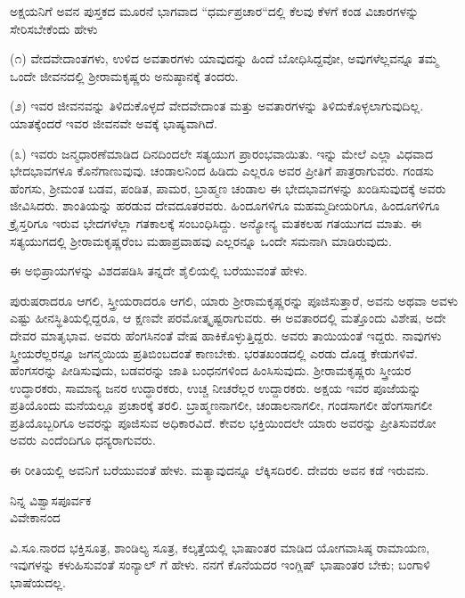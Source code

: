 ಅಕ್ಷಯನಿಗೆ ಅವನ ಪುಸ್ತಕದ ಮೂರನೆ ಭಾಗವಾದ “ಧರ್ಮಪ್ರಚಾರ“ದಲ್ಲಿ ಕೆಲವು ಕೆಳಗೆ ಕಂಡ ವಿಚಾರಗಳನ್ನು ಸೇರಿಸಬೇಕೆಂದು ಹೇಳು\enginline{-}
\vspace{0.3cm}

(೧) ವೇದವೇದಾಂತಗಳು, ಉಳಿದ ಅವತಾರಗಳು ಯಾವುದನ್ನು ಹಿಂದೆ ಬೋಧಿಸಿ\break ದ್ದವೋ, ಅವುಗಳೆಲ್ಲವನ್ನೂ ತಮ್ಮ ಒಂದೇ ಜೀವನದಲ್ಲಿ ಶ‍್ರೀರಾಮಕೃಷ್ಣರು ಅನುಷ್ಠಾನಕ್ಕೆ ತಂದರು.
\vspace{0.2cm}

(೨) ಇವರ ಜೀವನವನ್ನು ತಿಳಿದುಕೊಳ್ಳದೆ ವೇದವೇದಾಂತ ಮತ್ತು ಅವತಾರಗಳನ್ನು ತಿಳಿದುಕೊಳ್ಳಲಾಗುವುದಿಲ್ಲ. ಯಾತಕ್ಕೆಂದರೆ ಇವರ ಜೀವನವೇ ಅವಕ್ಕೆ ಭಾಷ್ಯವಾಗಿದೆ.
\vspace{0.3cm}

(೩) ಇವರು ಜನ್ಮಧಾರಣೆಮಾಡಿದ ದಿನದಿಂದಲೇ ಸತ್ಯಯುಗ ಪ್ರಾರಂಭವಾಯಿತು. ಇನ್ನು ಮೇಲೆ ಎಲ್ಲಾ ವಿಧವಾದ ಭೇದಭಾವಗಳೂ ಕೊನೆಗಾಣುವುವು. ಚಂಡಾಲನಿಂದ ಹಿಡಿದು ಎಲ್ಲರೂ ಅವರ ಪ್ರೀತಿಗೆ ಪಾತ್ರರಾಗುವರು. ಗಂಡಸು ಹೆಂಗಸು, ಶ‍್ರೀಮಂತ ಬಡವ, ಪಂಡಿತ, ಪಾಮರ, ಬ್ರಾಹ್ಮಣ ಚಂಡಾಲ ಈ ಭೇದಭಾವಗಳನ್ನು ಖಂಡಿಸುವುದಕ್ಕೆ ಅವರು ಜೀವಿಸಿದರು. ಶಾಂತಿಯನ್ನು ಹರಡುವ ದೇವದೂತರವರು. ಹಿಂದೂಗಳಿಗೂ ಮಹಮ್ಮದೀಯರಿಗೂ, ಹಿಂದೂಗಳಿಗೂ ಕ್ರೈಸ್ತರಿಗೂ ಇರುವ ಭೇದಗಳೆಲ್ಲಾ ಗತಕಾಲಕ್ಕೆ ಸಂಬಂಧಿಸಿದ್ದು. ಅನ್ಯೋನ್ಯ ಮತಕಲಹ ಗತಯುಗದ ಮಾತು. ಈ ಸತ್ಯಯುಗದಲ್ಲಿ ಶ‍್ರೀರಾಮಕೃಷ್ಣರೆಂಬ ಮಹಾಪ್ರವಾಹವು ಎಲ್ಲರನ್ನೂ ಒಂದೇ ಸಮನಾಗಿ ಮಾಡಿರುವುದು.
\vspace{0.2cm}

ಈ ಅಭಿಪ್ರಾಯಗಳನ್ನು ವಿಶದಪಡಿಸಿ ತನ್ನದೇ ಶೈಲಿಯಲ್ಲಿ ಬರೆಯುವಂತೆ ಹೇಳು.

ಪುರುಷರಾದರೂ ಆಗಲಿ, ಸ್ತ್ರೀಯರಾದರೂ ಆಗಲಿ, ಯಾರು ಶ‍್ರೀರಾಮಕೃಷ್ಣರನ್ನು ಪೂಜಿಸುತ್ತಾರೆ, ಅವನು ಅಥವಾ ಅವಳು ಎಷ್ಟು ಹೀನಸ್ಥಿತಿಯಲ್ಲಿದ್ದರೂ, ಆ ಕ್ಷಣವೇ ಪರಮೋತ್ಕೃಷ್ಟರಾಗುವರು. ಈ ಅವತಾರದಲ್ಲಿ ಮತ್ತೊಂದು ವಿಶೇಷ, ಅದೇ ದೇವರ ಮಾತೃಭಾವ. ಅವರು ಹೆಂಗಸಿನಂತೆ ವೇಷ ಹಾಕಿಕೊಳ್ಳುತ್ತಿದ್ದರು. ಅವರು ತಾಯಿಯಂತೆ ಇದ್ದರು. ನಾವುಗಳು ಸ್ತ್ರೀಯರೆಲ್ಲರನ್ನೂ ಜಗನ್ಮಯಿಯ ಪ್ರತಿಬಿಂಬದಂತೆ ಕಾಣಬೇಕು. ಭರತಖಂಡದಲ್ಲಿ ಎರಡು ದೊಡ್ಡ ಕೇಡುಗಳಿವೆ. ಹೆಂಗಸರನ್ನು ಪೀಡಿಸುವುದು, ಬಡವರನ್ನು ಜಾತಿ ಬಂಧನಗಳಿಂದ ಹಿಂಸಿಸುವುದು. ಶ‍್ರೀರಾಮಕೃಷ್ಣರು ಸ್ತ್ರೀಯರ ಉದ್ಧಾರಕರು, ಸಾಮಾನ್ಯ ಜನರ ಉದ್ಧಾರಕರು, ಉಚ್ಚ ನೀಚರೆಲ್ಲರ ಉದ್ದಾರಕರು. ಅಕ್ಷಯ ಇವರ ಪೂಜೆಯನ್ನು ಪ್ರತಿಯೊಂದು ಮನೆಯಲ್ಲೂ ಪ್ರಚಾರಕ್ಕೆ ತರಲಿ. ಬ್ರಾಹ್ಮಣನಾಗಲೀ, ಚಂಡಾಲನಾಗಲೀ, ಗಂಡಸಾಗಲೀ ಹೆಂಗಸಾಗಲೀ ಪ್ರತಿಯೊಬ್ಬರಿಗೂ ಅವರನ್ನು ಪೂಜಿಸುವ ಅಧಿಕಾರವಿದೆ. ಕೇವಲ ಭಕ್ತಿಯಿಂದಲೇ ಯಾರು ಅವರನ್ನು ಪ್ರೀತಿಸುವರೋ ಅವರು ಎಂದೆಂದಿಗೂ ಧನ್ಯರಾಗುವರು.

ಈ ರೀತಿಯಲ್ಲಿ ಅವನಿಗೆ ಬರೆಯುವಂತೆ ಹೇಳು. ಮತ್ಯಾವುದನ್ನೂ ಲೆಕ್ಕಿಸದಿರಲಿ. ದೇವರು ಅವನ ಕಡೆ ಇರುವನು.
\vspace{-0.3cm}

\begin{flushright}
ನಿನ್ನ ವಿಶ್ವಾಸಪೂರ್ವಕ\\ವಿವೇಕಾನಂದ
\end{flushright}
\vspace{-0.3cm}

ವಿ.ಸೂ.\enginline{-}ನಾರದ ಭಕ್ತಿಸೂತ್ರ, ಶಾಂಡಿಲ್ಯ ಸೂತ್ರ, ಕಲ್ಕತ್ತೆಯಲ್ಲಿ ಭಾಷಾಂತರ ಮಾಡಿದ ಯೋಗವಾಸಿಷ್ಠ ರಾಮಾಯಣ, ಇವುಗಳನ್ನು ಕಳುಹಿಸುವಂತೆ ಸಂನ್ಯಾಲ್ ಗೆ ಹೇಳು. ನನಗೆ ಕೊನೆಯದರ ಇಂಗ್ಲಿಷ್ ಭಾಷಾಂತರ ಬೇಕು; ಬಂಗಾಳಿ ಭಾಷೆಯದಲ್ಲ.


